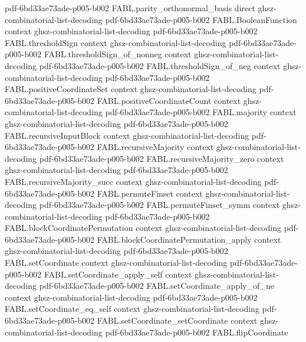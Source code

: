 \begin{theorem}
  {pdf-6bd33ae73ade-p005-b002}
\proofstep
  {FABL.parity_orthonormal_basis}
  {direct}
  {ghsz-combinatorial-list-decoding}
  {pdf-6bd33ae73ade-p005-b002}
\proofstep
  {FABL.BooleanFunction}
  {context}
  {ghsz-combinatorial-list-decoding}
  {pdf-6bd33ae73ade-p005-b002}
\proofstep
  {FABL.thresholdSign}
  {context}
  {ghsz-combinatorial-list-decoding}
  {pdf-6bd33ae73ade-p005-b002}
\proofstep
  {FABL.thresholdSign_of_nonneg}
  {context}
  {ghsz-combinatorial-list-decoding}
  {pdf-6bd33ae73ade-p005-b002}
\proofstep
  {FABL.thresholdSign_of_neg}
  {context}
  {ghsz-combinatorial-list-decoding}
  {pdf-6bd33ae73ade-p005-b002}
\proofstep
  {FABL.positiveCoordinateSet}
  {context}
  {ghsz-combinatorial-list-decoding}
  {pdf-6bd33ae73ade-p005-b002}
\proofstep
  {FABL.positiveCoordinateCount}
  {context}
  {ghsz-combinatorial-list-decoding}
  {pdf-6bd33ae73ade-p005-b002}
\proofstep
  {FABL.majority}
  {context}
  {ghsz-combinatorial-list-decoding}
  {pdf-6bd33ae73ade-p005-b002}
\proofstep
  {FABL.recursiveInputBlock}
  {context}
  {ghsz-combinatorial-list-decoding}
  {pdf-6bd33ae73ade-p005-b002}
\proofstep
  {FABL.recursiveMajority}
  {context}
  {ghsz-combinatorial-list-decoding}
  {pdf-6bd33ae73ade-p005-b002}
\proofstep
  {FABL.recursiveMajority_zero}
  {context}
  {ghsz-combinatorial-list-decoding}
  {pdf-6bd33ae73ade-p005-b002}
\proofstep
  {FABL.recursiveMajority_succ}
  {context}
  {ghsz-combinatorial-list-decoding}
  {pdf-6bd33ae73ade-p005-b002}
\proofstep
  {FABL.permuteFinset}
  {context}
  {ghsz-combinatorial-list-decoding}
  {pdf-6bd33ae73ade-p005-b002}
\proofstep
  {FABL.permuteFinset_symm}
  {context}
  {ghsz-combinatorial-list-decoding}
  {pdf-6bd33ae73ade-p005-b002}
\proofstep
  {FABL.blockCoordinatePermutation}
  {context}
  {ghsz-combinatorial-list-decoding}
  {pdf-6bd33ae73ade-p005-b002}
\proofstep
  {FABL.blockCoordinatePermutation_apply}
  {context}
  {ghsz-combinatorial-list-decoding}
  {pdf-6bd33ae73ade-p005-b002}
\proofstep
  {FABL.setCoordinate}
  {context}
  {ghsz-combinatorial-list-decoding}
  {pdf-6bd33ae73ade-p005-b002}
\proofstep
  {FABL.setCoordinate_apply_self}
  {context}
  {ghsz-combinatorial-list-decoding}
  {pdf-6bd33ae73ade-p005-b002}
\proofstep
  {FABL.setCoordinate_apply_of_ne}
  {context}
  {ghsz-combinatorial-list-decoding}
  {pdf-6bd33ae73ade-p005-b002}
\proofstep
  {FABL.setCoordinate_eq_self}
  {context}
  {ghsz-combinatorial-list-decoding}
  {pdf-6bd33ae73ade-p005-b002}
\proofstep
  {FABL.setCoordinate_setCoordinate}
  {context}
  {ghsz-combinatorial-list-decoding}
  {pdf-6bd33ae73ade-p005-b002}
\proofstep
  {FABL.flipCoordinate}

\end{theorem}
